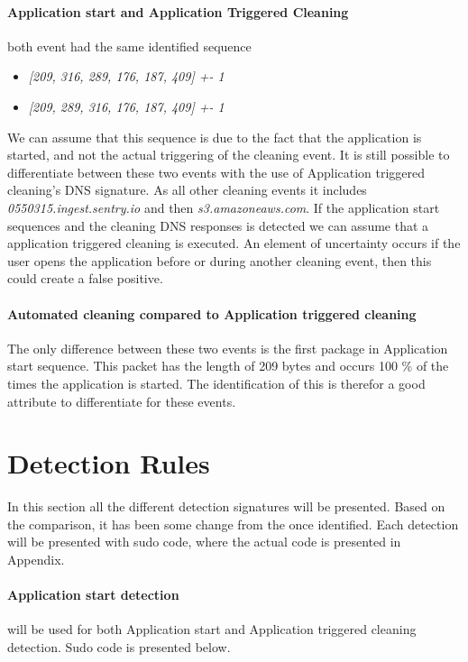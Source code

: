 \paragraph{Application start and Application Triggered Cleaning}
both event had the same identified sequence
\begin{itemize}
    \item \textit{[209, 316, 289, 176, 187, 409] +- 1}
    \item \textit{[209, 289, 316, 176, 187, 409] +- 1}
\end{itemize}
We can assume that this sequence is due to the fact that the application is started, and not the actual triggering of the cleaning event. It is still possible to differentiate between these two events with the use of Application triggered cleaning's DNS signature. As all other cleaning events it includes \textit{0550315.ingest.sentry.io} and then \textit{s3.amazoneaws.com}. If the application start sequences and the cleaning DNS responses is detected we can assume that a application triggered cleaning is executed. An element of uncertainty occurs if the user opens the application before or during another cleaning event, then this could create a false positive. 

\paragraph{Automated cleaning compared to Application triggered cleaning}
The only difference between these two events is the first package in Application start sequence. This packet has the length of 209 bytes and occurs 100 \% of the times the application is started. The identification of this is therefor a good attribute to differentiate for these events.

\section{Detection Rules}
In this section all the different detection signatures will be presented. Based on the comparison, it has been some change from the once identified. Each detection will be presented with sudo code, where the actual code is presented in Appendix. 

\paragraph{Application start detection} will be used for both Application start and Application triggered cleaning detection. Sudo code is presented below.


